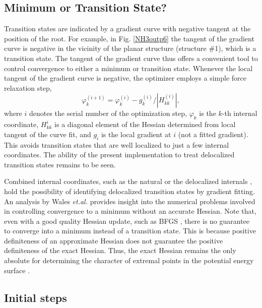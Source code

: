 \documentclass[prl,aps,preprint,showpacs,superbib]{revtex4}
\begin{document}
\subsection{Minimum or Transition State?}

Transition states are indicated by a gradient curve with  negative tangent at the position
of the root.  For example, in Fig. \ref{NH3outp6} the tangent of the gradient curve is negative 
in the vicinity of the planar structure (structure \#1), which is a transition state. The tangent 
of the gradient curve thus offers a convenient tool to control convergence to either a minimum 
or transition state.  Whenever the local tangent of the gradient curve is negative, the optimizer 
employs a simple force relaxation step,
\begin{equation}
\label{tseq}
\varphi_{k}^{(i+1)} = \varphi_{k}^{(i)} -g_{k}^{(i)}/|H_{kk}^{(i)}| ,
\end{equation}
where $i$ denotes the serial number of the optimization step,  $\varphi_{k}$ is the $k$-th internal coordinate,
 $H^i_{kk}$ is a diagonal element of the Hessian determined from local tangent of the curve fit, and
$g_i$ is the local gradient at $i$ (not a fitted gradient).
This avoids transition states that are well localized to just a few internal coordinates.
The ability of the present implementation to treat delocalized transition states
remains to be seen. 

Combined internal coordinates, such as the natural \cite{Pulay_natural_internals} or the
delocalized internals \cite{Baker_deloc_1}, hold the possibility of identifying delocalized transition 
states by gradient fitting.  An analysis by  Wales {\it et.al.} \cite{Wales_saddlepoint} provides 
insight into the numerical problems involved in controlling convergence to a minimum without an 
accurate Hessian.  Note that, even with a good quality Hessian update, such as BFGS \cite{RFletcher},
there is no guarantee to converge into a minimum instead of a transition state. 
This is because positive definiteness of an approximate Hessian does not guarantee
the positive definiteness of the exact Hessian.  Thus, the exact Hessian remains the only 
absolute for determining the character of extremal points in the potential energy 
surface \cite{Pulay_natural_internals}.

\subsection{Initial steps}
\end{document}
